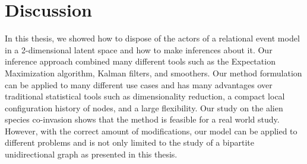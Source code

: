 \documentclass[mscthesis]{usiinfthesis}
\begin{document}





\chapter{Discussion}


In this thesis, we showed how to dispose of the actors of a relational event model in a 2-dimensional latent space and how to make inferences about it. Our inference approach combined many different tools such as the Expectation Maximization algorithm, Kalman filters, and smoothers. Our method formulation can be applied to many different use cases and has many advantages over traditional statistical tools such as dimensionality reduction, a compact local configuration history of nodes, and a large flexibility. Our study on the alien species co-invasion shows that the method is feasible for a real world study. However, with the correct amount of modifications, our model can be applied to different problems and is not only limited to the study of a bipartite unidirectional graph as presented in this thesis. 




 


%



%
%
%
%

%
\end{document}
